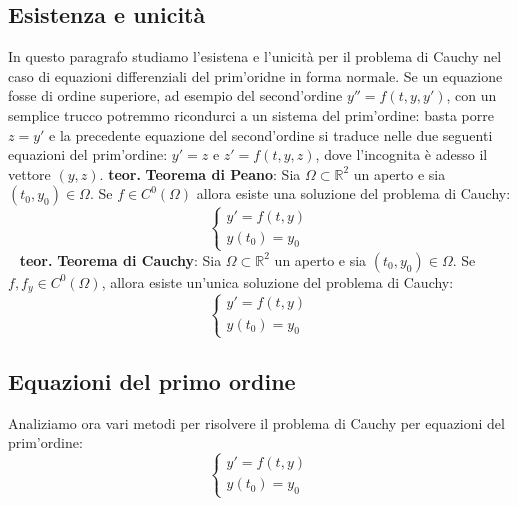 \subsection{Esistenza e unicità}
In questo paragrafo studiamo l'esistena e l'unicità per il problema di Cauchy nel caso di equazioni differenziali del prim'oridne in forma normale. Se un equazione fosse di ordine superiore, ad esempio del second'ordine $y'' = f(t,y,y')$, con un semplice trucco potremmo ricondurci a un sistema del prim'ordine: basta porre $z = y'$ e la precedente equazione del second'ordine si traduce nelle due seguenti equazioni del prim'ordine: $y'=z$ e $z' = f(t,y,z)$,  dove l'incognita è adesso il vettore $(y,z)$.\newline
\newline
\textbf{teor.} \textbf{Teorema di Peano}:\newline
Sia $\Omega \subset \mathbb{R}^2$ un aperto e sia $(t_0, y_0) \in \Omega$. Se $f \in C^0 (\Omega)$ allora esiste una soluzione del problema di Cauchy:
\[
    \begin{cases}
        y' = f(t,y)\\ y(t_0) = y_0
    \end{cases}
\]
\ \newline
\textbf{teor.} \textbf{Teorema di Cauchy}:\newline
Sia $\Omega \subset \mathbb{R}^2$ un aperto e sia $(t_0, y_0) \in \Omega$. Se $f,f_y \in C^0(\Omega)$, allora esiste un'unica soluzione del problema di Cauchy:
\[
    \begin{cases}
        y' = f(t,y)\\ y(t_0) = y_0
    \end{cases}
\]
\subsection{Equazioni del primo ordine}
Analiziamo ora vari metodi per risolvere il problema di Cauchy per equazioni del prim'ordine:
\[
    \begin{cases}
        y' = f(t,y)\\ y(t_0) = y_0
    \end{cases}
\]
